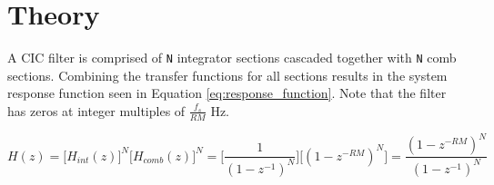 \section*{Theory}
\begin{flushleft}
	A CIC filter is comprised of \verb+N+ integrator sections cascaded together with \verb+N+ comb sections. Combining the transfer functions for all sections results in the system response function seen in Equation \ref{eq:response_function}. Note that the filter has zeros at integer multiples of $\frac{f_{s}}{RM}$ Hz.

	\begin{equation} \label{eq:response_function}
		H(z) = \Big[H_{int}(z)\Big]^N\Big[H_{comb}(z)\Big]^N = \Big[\frac{1}{(1-z^{-1})^N}\Big]\Big[(1-z^{-RM})^N\Big] = 	\frac{(1 - z^{-RM})^N}{(1-z^{-1})^N}
	\end{equation}


\end{flushleft}
